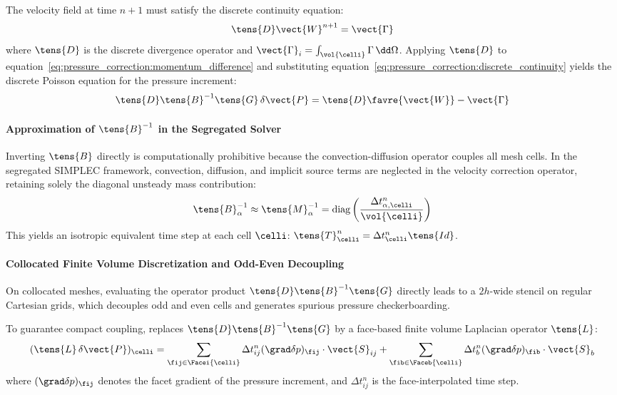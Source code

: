 The velocity field at time $n+1$ must satisfy the discrete continuity equation:
\begin{equation}
  \tens{D} \vect{W}^{n+1} = \vect{\Gamma}
  \label{eq:pressure_correction:discrete_continuity}
\end{equation}
where $\tens{D}$ is the discrete divergence operator and $\vect{\Gamma}_i = \int_{\vol{\celli}} \Gamma \, \dd \Omega$.
Applying $\tens{D}$ to equation~\eqref{eq:pressure_correction:momentum_difference} and
substituting equation~\eqref{eq:pressure_correction:discrete_continuity} yields the
discrete Poisson equation for the pressure increment:
\begin{equation}
  \tens{D} \tens{B}^{-1} \tens{G} \, \delta \vect{P} = \tens{D} \favre{\vect{W}} - \vect{\Gamma}
  \label{eq:pressure_correction:operator_poisson}
\end{equation}

\paragraph{Approximation of $\tens{B}^{-1}$ in the Segregated Solver}
Inverting $\tens{B}$ directly is computationally prohibitive because the
convection-diffusion operator couples all mesh cells. In the segregated SIMPLEC
framework, convection, diffusion, and implicit source terms
are neglected in the velocity correction operator, retaining solely the diagonal
unsteady mass contribution:
\begin{equation}
  \tens{B}_\alpha^{-1} \approx \tens{M}_\alpha^{-1} = \text{diag} \left( \frac{\Delta t_{\alpha,\celli}^n}{\vol{\celli}} \right)
\end{equation}
This yields an isotropic equivalent time step at each cell $\celli$:
$\tens{T}_\celli^n = \Delta t_\celli^n \tens{Id}$.

\paragraph{Collocated Finite Volume Discretization and Odd-Even Decoupling}
On collocated meshes, evaluating the operator product $\tens{D} \tens{B}^{-1} \tens{G}$
directly leads to a $2h$-wide stencil on regular Cartesian grids, which decouples
odd and even cells and generates spurious pressure checkerboarding.

To guarantee compact coupling, \CS replaces $\tens{D} \tens{B}^{-1} \tens{G}$ by a
face-based finite volume Laplacian operator $\tens{L}$:
\begin{equation}
  (\tens{L} \, \delta \vect{P})_\celli
  = \sum_{\fij \in \Facei{\celli}} \Delta t_{ij}^n (\grad \delta p)_{\fij} \cdot \vect{S}_{ij}
  + \sum_{\fib \in \Faceb{\celli}} \Delta t_{b}^n (\grad \delta p)_{\fib} \cdot \vect{S}_{b}
  \label{eq:pressure_correction:laplacian_operator}
\end{equation}
where $(\grad \delta p)_{\fij}$ denotes the facet gradient of the pressure increment,
and $\Delta t_{ij}^n$ is the face-interpolated time step.

